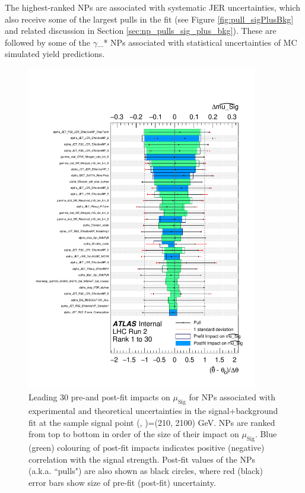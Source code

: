 The highest-ranked NPs are associated with systematic JER uncertainties, which also receive some of the largest pulls in the fit (see Figure \ref{fig:pull_sigPlusBkg} and related discussion in Section \ref{sec:np_pulls_sig_plus_bkg}). These are followed by some of the \(\gamma\)\_* NPs associated with statistical uncertainties of MC simulated yield predictions. 

\begin{figure}[h]
  \centering
  \includegraphics[width=0.9\textwidth]{Figures/8/ranking_mu_Sig_rank_0001_to_0030_zp2100_dm200_dh210_unblinded.pdf}
  \caption[Pre- and post-fit impacts for unblinded CRs (\ms, \mZp)=(210, 2100) GeV]{Leading 30 pre-and post-fit impacts on \(\mu_\text{Sig}\) for NPs associated with experimental and theoretical uncertainties in the signal+background fit at the sample signal point (\ms, \mZp)=(210, 2100) GeV. NPs are ranked from top to bottom in order of the size of their impact on \(\mu_\text{Sig}\). Blue (green) colouring of post-fit impacts indicates positive (negative) correlation with the signal strength. Post-fit values of the NPs (a.k.a. ``pulls") are also shown as black circles, where red (black) error bars show size of pre-fit (post-fit) uncertainty.}
  \label{fig:ranking_ms210}
\end{figure}

